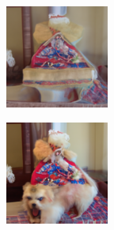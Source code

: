 \documentclass{article}
\begin{document}
\begin{figure}
    \begin{subfigure}[b]{0.5\linewidth}
        \begin{subfigure}[b]{0.242\linewidth}
        \includegraphics[width=\linewidth]{figures/imagenet128/solver_samples/imagenet128_fm_ot_159_05.png}
        \end{subfigure}%
        \begin{subfigure}[b]{0.242\linewidth}
        \includegraphics[width=\linewidth]{figures/imagenet128/solver_samples/imagenet128_fm_ot_159_10.png}

\end{subfigure}
\end{subfigure}
\end{figure}
\end{document}
